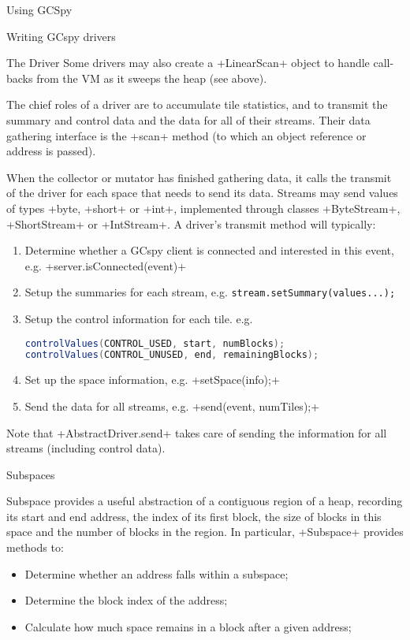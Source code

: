 \begin{section}{Using GCSpy}
\begin{subsection}{Writing GCspy drivers}
\begin{subsubsection}{The Driver}
Some drivers may also create a \spverb+LinearScan+ object to handle call-backs from the VM as it sweeps the heap (see above).

The chief roles of a driver are to accumulate tile statistics, and to transmit the summary and control data and the data for all of their streams. Their data gathering interface is the \spverb+scan+ method (to which an object reference or address is passed).

When the collector or mutator has finished gathering data, it calls the transmit of the driver for each space that needs to send its data. Streams may send values of types \spverb+byte, \spverb+short+ or \spverb+int+, implemented through classes \spverb+ByteStream+, \spverb+ShortStream+ or \spverb+IntStream+. A driver's transmit method will typically:
\begin{enumerate}
  \item Determine whether a GCspy client is connected and interested in this event, e.g. \spverb+server.isConnected(event)+
  \item Setup the summaries for each stream, e.g. \texttt{stream.set\-Sum\-ma\-ry(values...);}
  \item Setup the control information for each tile. e.g.
    \begin{lstlisting}[language=Java]
controlValues(CONTROL_USED, start, numBlocks);
controlValues(CONTROL_UNUSED, end, remainingBlocks);
    \end{lstlisting}
  \item Set up the space information, e.g. \spverb+setSpace(info);+
  \item Send the data for all streams, e.g. \spverb+send(event, numTiles);+
\end{enumerate}

Note that \spverb+AbstractDriver.send+ takes care of sending the information for all streams (including control data).

\end{subsubsection}

\begin{subsubsection}{Subspaces}

Subspace provides a useful abstraction of a contiguous region of a heap, recording its start and end address, the index of its first block, the size of blocks in this space and the number of blocks in the region. In particular, \spverb+Subspace+ provides methods to:
\begin{itemize}
  \item Determine whether an address falls within a subspace;
  \item Determine the block index of the address;
  \item Calculate how much space remains in a block after a given address;
\end{itemize}

\end{subsubsection}

\end{subsection}

\end{section}
